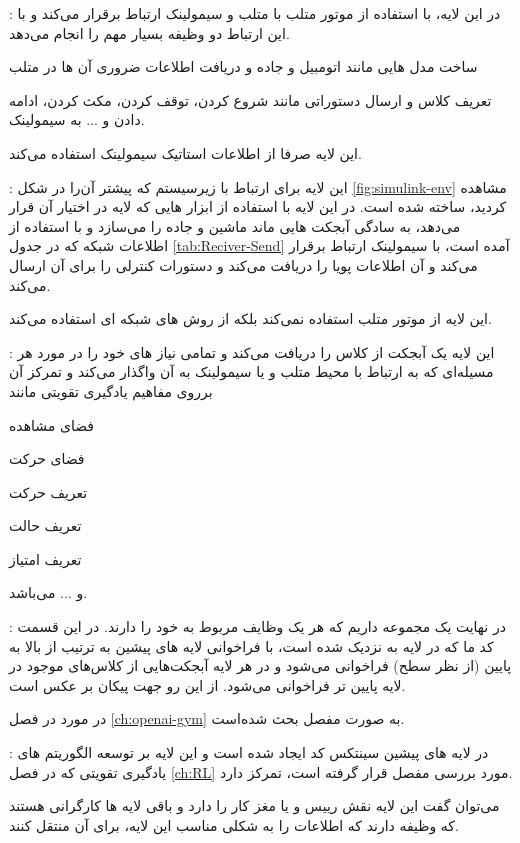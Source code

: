 \begin{circlelist}
	\item \textbf{} :
	در این لایه، با استفاده از موتور متلب با متلب و سیمولینک ارتباط برقرار می‌کند و با این ارتباط دو وظیفه بسیار مهم را انجام می‌دهد. 
	\begin{alphabetlist}
		\item 
		ساخت مدل هایی مانند اتومبیل و جاده و دریافت اطلاعات ضروری آن ها در متلب
		\item 
		تعریف کلاس  و ارسال دستوراتی مانند شروع کردن، توقف کردن، مکث کردن، ادامه دادن و ... به سیمولینک.
	\end{alphabetlist}
این لایه صرفا از اطلاعات استاتیک سیمولینک استفاده می‌کند.

	\item \textbf{} :
	این لایه برای ارتباط با زیرسیستم  که پیشتر آن‌را در شکل 
	\ref{fig:simulink-env}
	مشاهده کردید، ساخته شده است. در این لایه با استفاده از ابزار هایی که لایه 
	در اختیار آن قرار می‌دهد، به سادگی آبجکت هایی ماند ماشین و جاده را می‌سازد و با استفاده از اطلاعات شبکه که در جدول 
	\ref{tab:Reciver-Send}
	آمده است، با سیمولینک ارتباط برقرار می‌کند و آن اطلاعات پویا را دریافت می‌کند و دستورات کنترلی را برای آن ارسال می‌کند.
	
	این لایه از موتور متلب استفاده نمی‌کند بلکه از روش های شبکه ای استفاده می‌کند. 
	\item \textbf{} :
	این لایه یک آبجکت از کلاس 
	را دریافت می‌کند و تمامی نیاز های خود را در مورد هر مسیله‌ای که به ارتباط با محیط متلب و یا سیمولینک به آن واگذار می‌کند و تمرکز آن برروی مفاهیم یادگیری تقویتی مانند 
	 \begin{enuminline}
	 	\item فضای مشاهده
	 	\item فضای حرکت
	 	\item  تعریف حرکت
		\item تعریف حالت 
		\item تعریف امتیاز
 	\end{enuminline} 
 و ... می‌باشد.
 
	
	\item \textbf{} :
	در نهایت یک مجموعه داریم که هر یک وظایف مربوط به خود را دارند. در این قسمت کد ما که در لایه  به  نزدیک شده است، با فراخوانی لایه های پیشین به ترتیب از بالا به پایین (از نظر سطح) فراخوانی می‌شود و در هر لایه آبجکت‌هایی از کلاس‌های موجود در لایه پایین تر فراخوانی می‌شود. از این رو جهت پیکان بر عکس است. 
	
	در مورد  در فصل 
	\ref{ch:openai-gym}
	به صورت مفصل بحث شده‌است.
	
	\item \textbf{} :
	در لایه های پیشین سینتکس کد  ایجاد شده است و این لایه بر توسعه الگوریتم های یادگیری تقویتی که در فصل 
	\ref{ch:RL}
	مورد بررسی مفصل قرار گرفته است، تمرکز دارد.
	
	می‌توان گفت این لایه نقش رییس و یا مغز کار را دارد و باقی لایه ها کارگرانی هستند که وظیفه دارند که اطلاعات را به شکلی مناسب این لایه، برای آن منتقل کنند.
\end{circlelist}	



